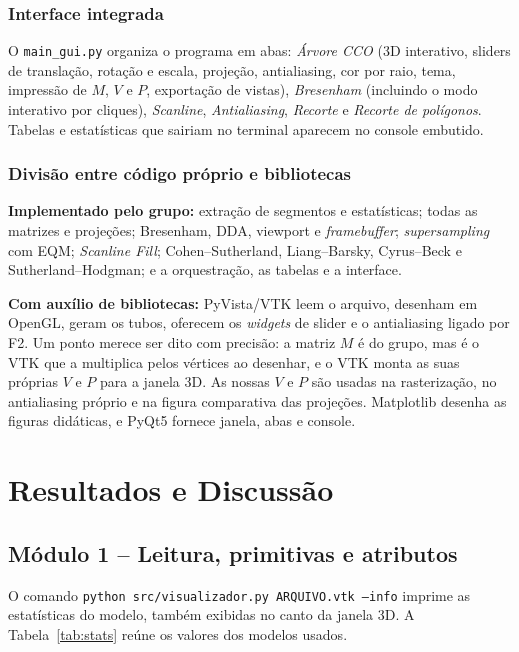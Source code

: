 \documentclass[11pt, a4paper]{article}
\newcommand{\arq}[1]{\texttt{#1}}
\begin{document}
\subsubsection{Interface integrada}
O \arq{main\_gui.py} organiza o programa em abas: \emph{Árvore CCO} (3D interativo,
sliders de translação, rotação e escala, projeção, antialiasing, cor por raio, tema,
impressão de $M$, $V$ e $P$, exportação de vistas), \emph{Bresenham} (incluindo o modo
interativo por cliques), \emph{Scanline}, \emph{Antialiasing}, \emph{Recorte} e
\emph{Recorte de polígonos}. Tabelas e estatísticas que sairiam no terminal
aparecem no console embutido.

\subsubsection{Divisão entre código próprio e bibliotecas}
\label{sec:autoria}
\textbf{Implementado pelo grupo:} extração de segmentos e estatísticas; todas as matrizes
e projeções; Bresenham, DDA, viewport e \emph{framebuffer}; \emph{supersampling} com EQM;
\emph{Scanline Fill}; Cohen--Sutherland, Liang--Barsky, Cyrus--Beck e Sutherland--Hodgman;
e a orquestração, as tabelas e a interface.

\textbf{Com auxílio de bibliotecas:} PyVista/VTK leem o arquivo, desenham em OpenGL, geram os
tubos, oferecem os \emph{widgets} de slider e o antialiasing ligado por F2.
Um ponto merece ser dito com precisão: a matriz $M$ é do grupo, mas é o VTK
que a multiplica pelos vértices ao desenhar, e o VTK monta as suas próprias
$V$ e $P$ para a janela 3D. As nossas $V$ e $P$ são usadas na rasterização, no
antialiasing próprio e na figura comparativa das projeções. Matplotlib desenha as
figuras didáticas, e PyQt5 fornece janela, abas e console.

\section{Resultados e Discussão}

\subsection{Módulo 1 -- Leitura, primitivas e atributos}
\label{sec:m1}
O comando \texttt{python src/visualizador.py ARQUIVO.vtk --info} imprime as
estatísticas do modelo, também exibidas no canto da janela 3D. A
Tabela~\ref{tab:stats} reúne os valores dos modelos usados.
\end{document}
